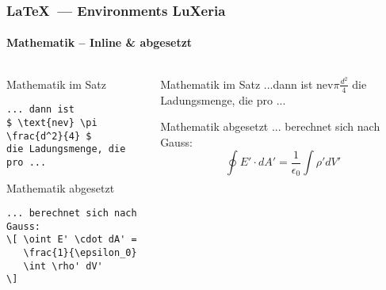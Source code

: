 \begin{frame}[fragile]
    \frametitle{\LaTeX~--- Environments \hfill{} \footnotesize{LuXeria}}
    \framesubtitle{Mathematik -- Inline \& abgesetzt}
    \begin{columns}
        \begin{column}{5cm}
            \begin{block}{Mathematik im Satz}
\begin{lstlisting}
... dann ist
$ \text{nev} \pi \frac{d^2}{4} $ 
die Ladungsmenge, die pro ...
\end{lstlisting}
            \end{block}
            \begin{block}{Mathematik abgesetzt}
\begin{lstlisting}
... berechnet sich nach Gauss: 
\[ \oint E' \cdot dA' = 
   \frac{1}{\epsilon_0} 
   \int \rho' dV' 
\]
\end{lstlisting}
            \end{block}
        \end{column}
        \begin{column}{5cm}
            \begin{block}{Mathematik im Satz}
            ...dann ist $\text{nev} \pi \frac{d^2}{4}$ die Ladungsmenge,
            die pro ...%
            \end{block}
            \begin{block}{Mathematik abgesetzt}
            ... berechnet sich nach Gauss:
            \[ \oint E' \cdot dA' = \frac{1}{\epsilon_0} \int \rho' dV' \]
            \end{block}
        \end{column}
    \end{columns}
\end{frame}

